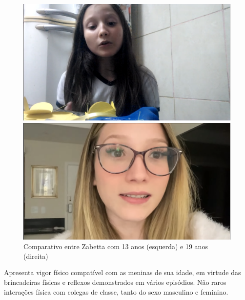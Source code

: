 \begin{figure}[h!]
    \centering

    \begin{minipage}[b]{0.45\linewidth}
        \centering
        \includegraphics[width=0.98\linewidth]{fig/Zabetta-13-anos-primeiro-video}
    \end{minipage}%
    \quad
    \begin{minipage}[b]{0.45\linewidth}
        \centering
        \includegraphics[width=0.98\linewidth]{fig/Zabetta-18-anos-facul}
    \end{minipage}%

    \quad

    \caption{Comparativo entre Zabetta com 13 anos (esquerda) e 19 anos (direita)}
    \label{fig:zabeta-comparativo}

\end{figure}

Apresenta vigor físico compatível com as meninas de sua idade, em virtude das brincadeiras físicas e reflexos demonstrados em vários episódios. Não raros interações física com colegas de classe, tanto do sexo masculino e feminino.

